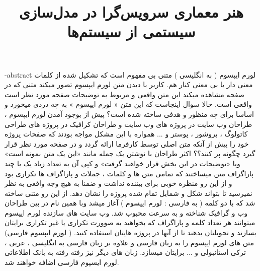 \documentclass[oneside,openany,msc]{SBU-Thesis}
\begin{document}
	\title{هنر معماری سرویس‌گرا در مدل‌سازی سیستمی از سیستم‌ها}
	
	\subject{فناوری اطلاعات}
	
	
	
	

	
	
	

	\fa-abstract{
		لورم ایپسوم ( به انگلیسی  ) متنی بی مفهوم است که تشکیل شده از کلمات معنی دار یا بی معنی کنار هم. کاربر با دیدن متن لورم ایپسوم تصور میکند متنی که در صفحه مشاهده میکند این متن واقعی و مربوط به توضیحات صفحه مورد نظر است واقعی است. حالا سوال اینجاست که این متن « لورم ایپسوم » به چه دردی میخورد و اساسا برای چه منظور و هدفی ساخته شده است؟ پیش از بوجود آمدن لورم ایپسوم ، طراحان وب سایت در پروژه های وب سایت و طراحان کرافیک در پروژه های طراحی کاتولوگ ، بروشور ، پوستر و ... همواره با این مشکل مواجه بودند که صفحات پروژه خود را پیش از آنکه متن اصلی توسط کارفرما ارائه گردد و در صفحه مورد نظر قرار گیرد چگونه پر کنند؟؟ اکثر طراحان با نوشتن یک جمله مانند «این یک متن نمونه است» ویا «توضیحات در این بخش قرار خواهند گرفت» و کپی آن به تعداد زیاد یک یا چند پاراگراف متن میساختند که تمامی متن ها و کلمات ، جملات و پاراگراف ها تکراری بود و از این رو منظره خوبی برای بیننده نداشت و ضمنا به هیچ وجه واقعی به نظر نمیرسید تا بتواند شکل و شمایل تمام شده پروژه را نشان دهد. از این رو متنی ساخته شد که با دو کلمه ( به فارسی : لورم ایپسوم ) آغاز میشد وبا همین نام در بین طراحان وب و گرافیک شناخته و به سرعت محبوب شد. وب سایت های سازنده لورم ایپسوم میتوانند هر تعداد کلمه و پاراگراف که بخواهید به صوورت تکراری یا غیر تکراری برایتان بسازند و تحویلتان بدهند تا از آنها در پروژه هایتان استفاده کنید. ( لورم ایپسوم فارسی) متن های لورم ایپسوم را به زبان فارسی و علاوه بر زبان فارسی به انگلیسی ، عربی ، ترکی استانبولی و ... برایتان میسازد. زبان های دیگر نیز رفته رفته به بانک اطلاعاتی لورم ایسپوم فارسی اضافه خواهند شد.  
	}
	
\end{document}
